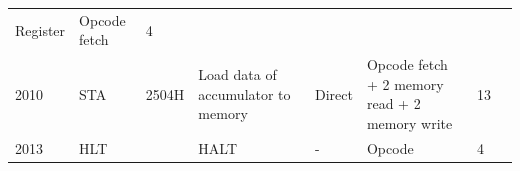 \documentclass[11pt,twocolumn]{article}
\begin{document}
\begin{longtable}[]{@{}llllllll@{}}
\begin{minipage}[t]{0.09\columnwidth}
Register\strut
\end{minipage} & \begin{minipage}[t]{0.25\columnwidth}\raggedright
Opcode fetch\strut
\end{minipage} & \begin{minipage}[t]{0.05\columnwidth}\raggedright
4\strut
\end{minipage} & \begin{minipage}[t]{0.03\columnwidth}\raggedright
\strut
\end{minipage}\tabularnewline
\begin{minipage}[t]{0.04\columnwidth}\raggedright
2010\strut
\end{minipage} & \begin{minipage}[t]{0.05\columnwidth}\raggedright
STA\strut
\end{minipage} & \begin{minipage}[t]{0.05\columnwidth}\raggedright
2504H\strut
\end{minipage} & \begin{minipage}[t]{0.23\columnwidth}\raggedright
Load data of accumulator to memory\strut
\end{minipage} & \begin{minipage}[t]{0.09\columnwidth}\raggedright
Direct\strut
\end{minipage} & \begin{minipage}[t]{0.25\columnwidth}\raggedright
Opcode fetch + 2 memory read + 2 memory write\strut
\end{minipage} & \begin{minipage}[t]{0.05\columnwidth}\raggedright
13\strut
\end{minipage} & \begin{minipage}[t]{0.03\columnwidth}\raggedright
\strut
\end{minipage}\tabularnewline
\begin{minipage}[t]{0.04\columnwidth}\raggedright
2013\strut
\end{minipage} & \begin{minipage}[t]{0.05\columnwidth}\raggedright
HLT\strut
\end{minipage} & \begin{minipage}[t]{0.05\columnwidth}\raggedright
\strut
\end{minipage} & \begin{minipage}[t]{0.23\columnwidth}\raggedright
HALT\strut
\end{minipage} & \begin{minipage}[t]{0.09\columnwidth}\raggedright
-\strut
\end{minipage} & \begin{minipage}[t]{0.25\columnwidth}\raggedright
Opcode\strut
\end{minipage} & \begin{minipage}[t]{0.05\columnwidth}\raggedright
4\strut
\end{minipage} & \begin{minipage}[t]{0.03\columnwidth}\raggedright
\strut
\end{minipage}\tabularnewline
\bottomrule
\end{longtable}
\end{document}
